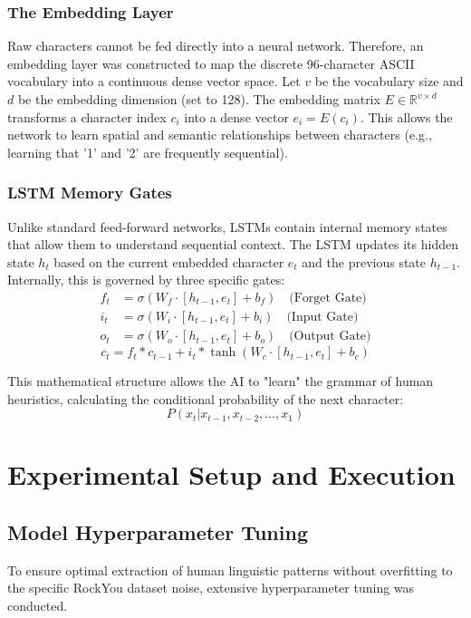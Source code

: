 \documentclass[conference]{IEEEtran}
\begin{document}
\subsubsection{The Embedding Layer}
Raw characters cannot be fed directly into a neural network. Therefore, an embedding layer was constructed to map the discrete 96-character ASCII vocabulary into a continuous dense vector space. Let $v$ be the vocabulary size and $d$ be the embedding dimension (set to 128). The embedding matrix $E \in \mathbb{R}^{v \times d}$ transforms a character index $c_i$ into a dense vector $e_i = E(c_i)$. This allows the network to learn spatial and semantic relationships between characters (e.g., learning that '1' and '2' are frequently sequential).

\subsubsection{LSTM Memory Gates}
Unlike standard feed-forward networks, LSTMs contain internal memory states that allow them to understand sequential context. The LSTM updates its hidden state $h_t$ based on the current embedded character $e_t$ and the previous state $h_{t-1}$. Internally, this is governed by three specific gates:
\begin{align}
f_t &= \sigma(W_f \cdot [h_{t-1}, e_t] + b_f) \quad \text{(Forget Gate)} \\
i_t &= \sigma(W_i \cdot [h_{t-1}, e_t] + b_i) \quad \text{(Input Gate)} \\
o_t &= \sigma(W_o \cdot [h_{t-1}, e_t] + b_o) \quad \text{(Output Gate)}
\end{align}
\begin{equation}
c_t = f_t * c_{t-1} + i_t * \tanh(W_c \cdot [h_{t-1}, e_t] + b_c)
\end{equation}

This mathematical structure allows the AI to "learn" the grammar of human heuristics, calculating the conditional probability of the next character:
\begin{equation}
P(x_t | x_{t-1}, x_{t-2}, \dots, x_1)
\end{equation}

\section{Experimental Setup and Execution}

\subsection{Model Hyperparameter Tuning}
To ensure optimal extraction of human linguistic patterns without overfitting to the specific RockYou dataset noise, extensive hyperparameter tuning was conducted.
\end{document}
